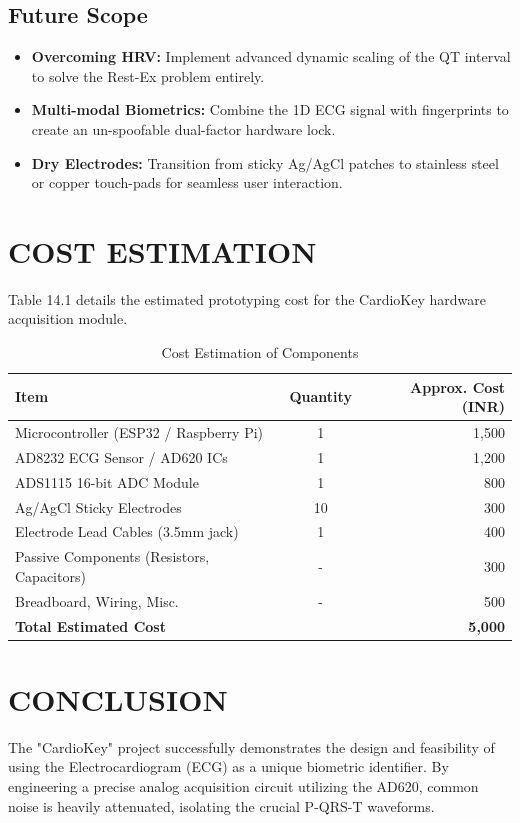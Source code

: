 \documentclass[12pt,a4paper]{report}
\begin{document}
\section{Future Scope}
\begin{itemize}
    \item \textbf{Overcoming HRV:} Implement advanced dynamic scaling of the QT interval to solve the Rest-Ex problem entirely.
    \item \textbf{Multi-modal Biometrics:} Combine the 1D ECG signal with fingerprints to create an un-spoofable dual-factor hardware lock.
    \item \textbf{Dry Electrodes:} Transition from sticky Ag/AgCl patches to stainless steel or copper touch-pads for seamless user interaction.
\end{itemize}

\chapter{COST ESTIMATION}
Table 14.1 details the estimated prototyping cost for the CardioKey hardware acquisition module.

\begin{table}[h]
\centering
\caption{Cost Estimation of Components}
\vspace{0.3cm}
\begin{tabular}{|l|c|r|}
\hline
\textbf{Item} & \textbf{Quantity} & \textbf{Approx. Cost (INR)} \\
\hline
Microcontroller (ESP32 / Raspberry Pi) & 1 & 1,500 \\
AD8232 ECG Sensor / AD620 ICs & 1 & 1,200 \\
ADS1115 16-bit ADC Module & 1 & 800 \\
Ag/AgCl Sticky Electrodes & 10 & 300 \\
Electrode Lead Cables (3.5mm jack) & 1 & 400 \\
Passive Components (Resistors, Capacitors) & - & 300 \\
Breadboard, Wiring, Misc. & - & 500 \\
\hline
\textbf{Total Estimated Cost} & & \textbf{5,000} \\
\hline
\end{tabular}
\end{table}

\chapter{CONCLUSION}
The "CardioKey" project successfully demonstrates the design and feasibility of using the Electrocardiogram (ECG) as a unique biometric identifier. By engineering a precise analog acquisition circuit utilizing the AD620, common noise is heavily attenuated, isolating the crucial P-QRS-T waveforms. 
\end{document}
